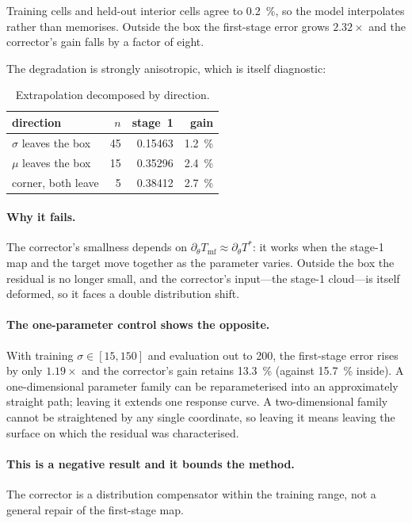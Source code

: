﻿\documentclass[11pt,a4paper]{article}
\begin{document}
Training cells and held-out interior cells agree to \SI{0.2}{\percent}, so the model interpolates
rather than memorises. Outside the box the first-stage error grows $2.32\times$ and the corrector's
gain falls by a factor of eight.

The degradation is strongly anisotropic, which is itself diagnostic:

\begin{table}[h]
\centering\small
\begin{tabular}{@{}lrrr@{}}
\toprule
direction & $n$ & stage~1 & gain \\
\midrule
$\sigma$ leaves the box & 45 & 0.15463 & \SI{1.2}{\percent} \\
$\mu$ leaves the box & 15 & 0.35296 & \SI{2.4}{\percent} \\
corner, both leave & 5 & 0.38412 & \SI{2.7}{\percent} \\
\bottomrule
\end{tabular}
\caption{Extrapolation decomposed by direction.}
\end{table}

\paragraph{Why it fails.} The corrector's smallness depends on
$\partial_\theta T_{\text{mf}}\approx\partial_\theta T^*$: it works when the stage-1 map and the
target move together as the parameter varies. Outside the box the residual is no longer small, and
the corrector's input---the stage-1 cloud---is itself deformed, so it faces a double distribution
shift.

\paragraph{The one-parameter control shows the opposite.} With training $\sigma\in[15,150]$ and
evaluation out to 200, the first-stage error rises by only $1.19\times$ and the corrector's gain
retains \SI{13.3}{\percent} (against \SI{15.7}{\percent} inside). A one-dimensional parameter family
can be reparameterised into an approximately straight path; leaving it extends one response curve. A
two-dimensional family cannot be straightened by any single coordinate, so leaving it means leaving
the surface on which the residual was characterised.

\paragraph{This is a negative result and it bounds the method.} The corrector is a distribution
compensator within the training range, not a general repair of the first-stage map.
\end{document}

